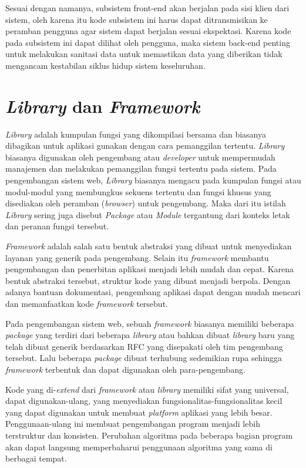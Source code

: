     Sesuai dengan namanya, subsistem front-end akan berjalan pada sisi klien
    dari sistem, oleh karena itu kode subsistem ini harus dapat ditransmisikan
    ke peramban pengguna agar sistem dapat berjalan sesuai ekspektasi. Karena
    kode pada subsistem ini dapat dilihat oleh pengguna, maka sistem back-end
    penting untuk melakukan sanitasi data untuk memastikan data yang diberikan
    tidak mengancam kestabilan siklus hidup sistem keseluruhan.

\section{\textit{Library} dan \textit{Framework}}
    \textit{Library} adalah kumpulan fungsi yang dikompilasi bersama dan
    biasanya dibagikan untuk aplikasi gunakan dengan cara pemanggilan tertentu.
    \textit{Library} biasanya digunakan oleh pengembang atau \emph{developer}
    untuk mempermudah manajemen dan melakukan pemanggilan fungsi tertentu pada
    sistem. Pada pengembangan sistem web, \textit{Library} biasanya mengacu pada
    kumpulan fungsi atau modul-modul yang membungkus sekuens tertentu dan fungsi
    khusus yang disediakan oleh peramban (\textit{browser}) untuk pengembang.
    Maka dari itu istilah \textit{Library} sering juga disebut \textit{Package}
    atau \textit{Module} tergantung dari konteks letak dan peranan fungsi
    tersebut\cite{npm-docs:packages-n-modules}\cite{node-docs:CommonJS-modules}.
    
    \textit{Framework} adalah salah satu bentuk abstraksi yang dibuat untuk
    menyediakan layanan yang generik pada pengembang. Selain itu
    \textit{framework} membantu pengembangan dan penerbitan aplikasi menjadi
    lebih mudah dan cepat. Karena bentuk abstraksi tersebut, struktur kode yang
    dibuat menjadi berpola. Dengan adanya bantuan dokumentasi, pengembang
    aplikasi dapat dengan mudah mencari dan memanfaatkan kode \textit{framework}
    tersebut.
    
    Pada pengembangan sistem web, sebuah \textit{framework} biasanya memiliki
    beberapa \textit{package} yang terdiri dari beberapa \textit{library} atau
    bahkan dibuat \textit{library} baru yang telah dibuat generik berdasarkan
    RFC yang disepakati oleh tim pengembang tersebut\cite{reactjs:rfc}. Lalu
    beberapa \textit{package} dibuat terhubung sedemikian rupa sehingga
    \textit{framework} terbentuk dan dapat digunakan oleh para-pengembang.
    
    Kode yang di-\textit{extend} dari \textit{framework} atau \textit{library}
    memiliki sifat yang universal, dapat digunakan-ulang, yang menyediakan
    fungsionalitas-fungsionalitas kecil yang dapat digunakan untuk membuat
    \textit{platform} aplikasi yang lebih besar. Penggunaan-ulang ini membuat
    pengembangan program menjadi lebih terstruktur dan konsisten. Perubahan
    algoritma pada beberapa bagian program akan dapat langsung memperbaharui
    penggunaan algoritma yang sama di berbagai tempat.
    
